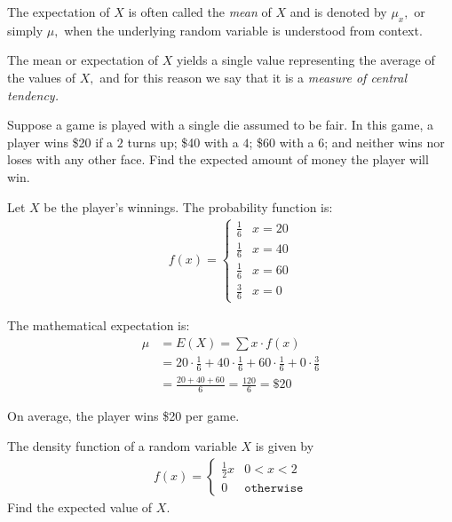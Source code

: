  The expectation of $X$ is often called the \emph{mean} of $X$ and is denoted by $\mu_{x},$ or simply $\mu,$ when the underlying random variable is understood from context.

 The mean or expectation of $X$ yields a single value representing the average of the values of $X,$ and for this reason we say that it is a \emph{measure of central tendency.}

 \begin{ejemplo}
  \label{exmp:2.9.1}
  Suppose a game is played with a single die assumed to be fair. In this game, a player wins \$20 if a $2$ turns up; \$40 with a $4$; \$60 with a $6$; and neither wins nor loses with any other face. Find the expected amount of money the player will win.
 \end{ejemplo}

\begin{solucion}
	Let $X$ be the player's winnings. The probability function is:
	\begin{align}
		f(x) = \begin{cases}
			\frac{1}{6} & x = 20 \\
			\frac{1}{6} & x = 40 \\
			\frac{1}{6} & x = 60 \\
			\frac{3}{6} & x = 0
		\end{cases}
	\end{align}
	
	The mathematical expectation is:
	\begin{align}
		\mu &= E(X) = \sum x \cdot f(x) \\
		&= 20 \cdot \frac{1}{6} + 40 \cdot \frac{1}{6} + 60 \cdot \frac{1}{6} + 0 \cdot \frac{3}{6} \\
		&= \frac{20 + 40 + 60}{6} = \frac{120}{6} = \$20
	\end{align}
	
	On average, the player wins \$20 per game.
\end{solucion}

 \begin{ejemplo}
  \label{exmp:2.9.2}
  The density function of a random variable $X$ is given by
  \begin{align}
   f(x)=
   \begin{cases}
    \frac{1}{2}x & 0<x<2 \\
    0 & \texttt{otherwise}
   \end{cases}
  \end{align}
Find the expected value of $X.$
 \end{ejemplo}


